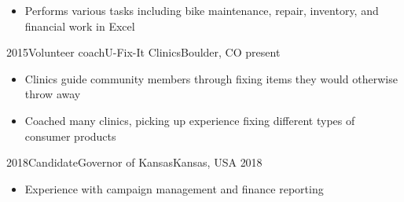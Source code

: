 \begin{experiences}
{\begin{itemize}
        \item Performs various tasks including bike maintenance, repair, inventory, and financial work in Excel
    \end{itemize}}
    \emptySeparator
\experience
    {2015}{Volunteer coach}{U-Fix-It Clinics}{Boulder, CO}
    {present}{\begin{itemize}
        \item Clinics guide community members through fixing items they would otherwise throw away
        \item Coached many clinics, picking up experience fixing different types of consumer products
    \end{itemize}}
    \emptySeparator
\experience
    {2018}{Candidate}{Governor of Kansas}{Kansas, USA}
    {2018}{\begin{itemize}
        \item Experience with campaign management and finance reporting
    \end{itemize}}
\end{experiences}
